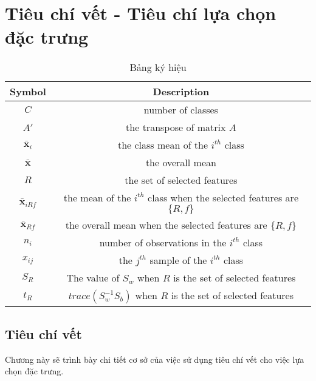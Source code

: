 \chapter{Tiêu chí vết - Tiêu chí lựa chọn đặc trưng}
\begin{table}[htbp]
	\caption{Bảng ký hiệu}
	\centering
		\begin{tabular}{|c|c|}
			\hline
			\textbf{Symbol} & \textbf{Description} \\\hline
			$C$ & number of classes   \\
			
			
			$A'$& the transpose of matrix $A$ \\
			
			$\bar{\boldsymbol{x}}_i$& the class mean of the $i^{th}$ class   \\
			
			$\bar{\boldsymbol{x}}$& the overall mean   \\
			$R$ & the set of selected features \\
			$\bar{\boldsymbol{x}}_{iRf}$ & the mean of the $i^{th}$ class when the selected features are $\{R,f\}$\\
			$\bar{\boldsymbol{x}}_{Rf}$ &  the overall mean when the selected features are $\{R, f\}$\\
			
			$n_i$ & number of observations in the $i^{th}$ class   \\
			
			$x_{ij}$& the $j^{th}$ sample of the $i^{th}$ class   \\
			
			
			$S_{R}$ &The value of $S_w$ when $R$ is the set of selected features \\
			
			$t_{R}$ & $trace(S_w^{-1}S_b)$ when $R$ is the set of selected features \\
			\hline
		\end{tabular}
		\label{tab_notations}
\end{table}
\section{Tiêu chí vết}
Chương này sẽ trình bày chi tiết cơ sở của việc sử dụng tiêu chí vết cho việc lựa chọn đặc trưng.

